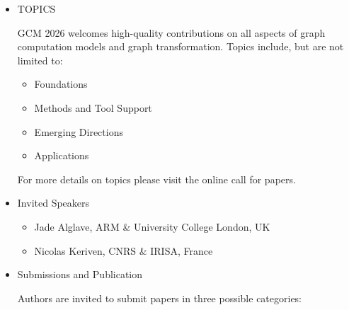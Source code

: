 \documentclass[prodmode,acmtecs]{acmsmall} %
\begin{document}
\begin{itemize}
  Should you have any problem meeting the deadlines, please send an email to the organizers: 
 
\begin{itemize}\item  Nicolas Behr (nicolas.behr@irif.fr)
\item  Stefania Dumbrava (stefania.dumbrava@ensiie.fr)
\end{itemize} 
\item  TOPICS  
 
  GCM 2026 welcomes high-quality contributions on all aspects of graph computation models and graph transformation. Topics include, but are not limited to: 
 
\begin{itemize}\item  Foundations
\item  Methods and Tool Support
\item  Emerging Directions
\item  Applications
\end{itemize} 
  For more details on topics please visit the online call for papers. 
 
\item  Invited Speakers 
 
\begin{itemize}\item  Jade Alglave, ARM \& University College London, UK
\item  Nicolas Keriven, CNRS \& IRISA, France
\end{itemize} 
\item  Submissions and Publication 
 
  Authors are invited to submit papers in three possible categories: 
 

\end{itemize}
\end{document}

